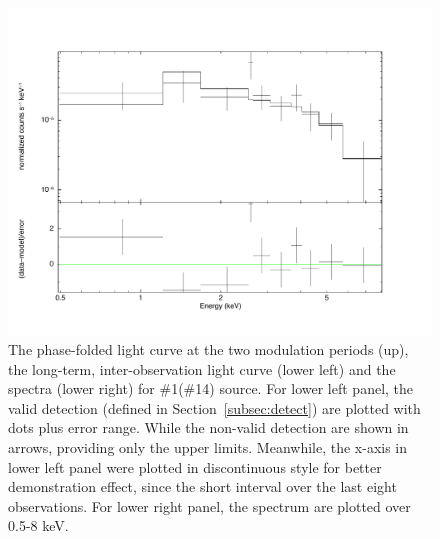 \documentclass[fleqn,usenatbib]{mnras}
\begin{document}
\begin{figure}
\begin{minipage}[t]{0.45\textwidth}
\includegraphics[width=1.02\textwidth]{./figure/LW/324001_spec.pdf}
\end{minipage}
\caption{The phase-folded light curve at the two modulation periods (up), the long-term, inter-observation light curve (lower left) and the spectra (lower right) for \#1(\#14) source.
For lower left panel, the valid detection (defined in Section~\ref{subsec:detect}) are plotted with dots plus error range. While the non-valid detection are shown in arrows, providing only the upper limits. Meanwhile, the x-axis in lower left panel were plotted in discontinuous style for better demonstration effect, since the short interval over the last eight observations.
For lower right panel, the spectrum are plotted over 0.5-8 keV.}
\label{fig:pCV_sample_1}
\end{figure}
\end{document}
